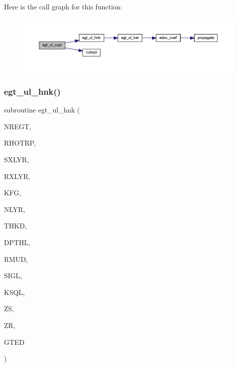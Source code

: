 Here is the call graph for this function\+:\nopagebreak
\begin{figure}[H]
\begin{center}
\leavevmode
\includegraphics[width=350pt]{Leroi__c_8f90_a55b57146ea180fed3080a010421620fe_cgraph}
\end{center}
\end{figure}
\mbox{\label{Leroi__c_8f90_a1d1da4021109f56adcc9ad84d89cd1b7}} 
\subsubsection{\texorpdfstring{egt\+\_\+ul\+\_\+hnk()}{egt\_ul\_hnk()}}
{\footnotesize\ttfamily subroutine egt\+\_\+ul\+\_\+hnk (\begin{DoxyParamCaption}\item[{integer}]{N\+R\+E\+GT,  }\item[{real, dimension(nregt)}]{R\+H\+O\+T\+RP,  }\item[{integer}]{S\+X\+L\+YR,  }\item[{integer}]{R\+X\+L\+YR,  }\item[{integer}]{K\+FG,  }\item[{integer}]{N\+L\+YR,  }\item[{real(kind=ql), dimension (nlyr)}]{T\+H\+KD,  }\item[{real(kind=ql), dimension (nlyr)}]{D\+P\+T\+HL,  }\item[{real(kind=ql), dimension(0\+:nlyr)}]{R\+M\+UD,  }\item[{complex(kind=ql), dimension (nlyr)}]{S\+I\+GL,  }\item[{complex(kind=ql), dimension (nlyr)}]{K\+S\+QL,  }\item[{real(kind=ql)}]{ZS,  }\item[{real(kind=ql)}]{ZR,  }\item[{complex(kind=ql), dimension(nregt,7)}]{G\+T\+ED }\end{DoxyParamCaption})}

